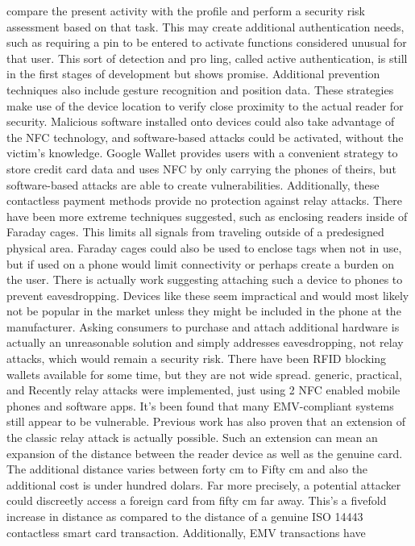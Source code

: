 \documentclass[conference]{IEEEtran}
\begin{document}
compare the present activity with the profile and perform a security risk assessment based on that task. This may create additional authentication needs, such as
requiring a pin to be entered to activate functions considered unusual for that user.
This sort of detection and pro ling, called active authentication, is still in the first stages of development but shows promise.
Additional prevention techniques also include gesture recognition and position data. These strategies make use of the device location to verify close proximity to the
actual reader for security.
Malicious software installed onto devices could also take advantage of the NFC
technology, and software-based attacks could be activated, without the victim's knowledge. Google Wallet provides users with a convenient strategy to
store credit card data and uses NFC by only carrying the phones of theirs, but software-based attacks are able to create vulnerabilities. Additionally, these
contactless payment methods provide no protection against relay attacks.
There have been more extreme techniques suggested, such as enclosing readers inside of Faraday cages. This limits all signals from traveling outside of a predesigned
physical area. Faraday cages could also be used to enclose tags when not in use,
but if used on a phone would limit connectivity or perhaps create a burden on the user. There
is actually work suggesting attaching such a device to phones to prevent eavesdropping.
Devices like these seem impractical and would most likely not be popular in the market unless they might be included in the phone at the manufacturer. Asking
consumers to purchase and attach additional hardware is actually an unreasonable solution
and simply addresses eavesdropping, not relay attacks, which would remain a security risk. There have been RFID blocking wallets available for some time, but they
are not wide spread.
generic, practical, and Recently relay attacks were
implemented, just using 2 NFC enabled mobile phones and software apps. It's been found that many
EMV-compliant systems still appear to be vulnerable.
Previous work has also proven that an extension of the classic relay attack is actually possible. Such an extension can mean
an expansion of the distance between the reader device as well as the genuine card. The additional distance varies between forty cm to
Fifty cm and also the additional cost is under hundred dolars. Far more precisely,
a potential attacker could discreetly access a foreign card from fifty cm far away. This's a fivefold increase in distance
as compared to the distance of a genuine ISO 14443 contactless smart card transaction. Additionally, EMV transactions have
\end{document}

